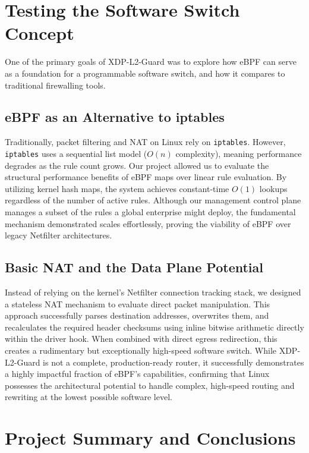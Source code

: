 \documentclass[11pt,a4paper]{article}
\begin{document}
\section{Testing the Software Switch Concept}

One of the primary goals of XDP-L2-Guard was to explore how eBPF can serve as a foundation for a programmable software switch, and how it compares to traditional firewalling tools.

\subsection{eBPF as an Alternative to iptables}

Traditionally, packet filtering and NAT on Linux rely on \texttt{iptables}.
However, \texttt{iptables} uses a sequential list model ($O(n)$ complexity), meaning performance degrades as the rule count grows.
Our project allowed us to evaluate the structural performance benefits of eBPF maps over linear rule evaluation.
By utilizing kernel hash maps, the system achieves constant-time $O(1)$ lookups regardless of the number of active rules.
Although our management control plane manages a subset of the rules a global enterprise might deploy, the fundamental mechanism demonstrated scales effortlessly, proving the viability of eBPF over legacy Netfilter architectures.

\subsection{Basic NAT and the Data Plane Potential}

Instead of relying on the kernel's Netfilter connection tracking stack, we designed a stateless NAT mechanism to evaluate direct packet manipulation.
This approach successfully parses destination addresses, overwrites them, and recalculates the required header checksums using inline bitwise arithmetic directly within the driver hook.
When combined with direct egress redirection, this creates a rudimentary but exceptionally high-speed software switch.
While XDP-L2-Guard is not a complete, production-ready router, it successfully demonstrates a highly impactful fraction of eBPF's capabilities, confirming that Linux possesses the architectural potential to handle complex, high-speed routing and rewriting at the lowest possible software level.

\section{Project Summary and Conclusions}
\end{document}
